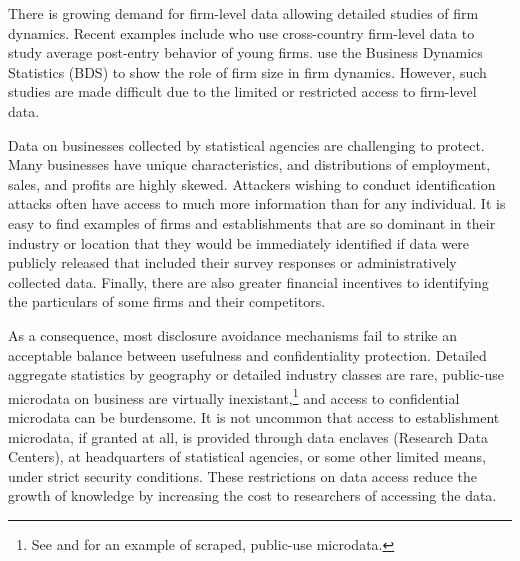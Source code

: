 There is growing demand for firm-level data allowing detailed studies of firm dynamics. Recent examples include \textcite{NBERc0480} who use cross-country firm-level data to study average post-entry behavior of young firms. \textcite{10.1257/aer.20141280} use the Business Dynamics Statistics (BDS) to show the role of firm size in firm dynamics. However, such studies are made difficult due to the limited or restricted access to firm-level data.

Data on businesses collected by statistical agencies are challenging to protect. Many businesses have unique characteristics, and distributions of employment, sales, and profits are highly skewed. Attackers wishing to conduct identification attacks often have access to much more information than for any individual. It is easy to find examples of firms and establishments that are so dominant in their industry or location that they would be immediately identified if  data were publicly released that included their survey responses or administratively collected data. Finally, there are also greater financial incentives to identifying the particulars of some firms and their competitors.

As a consequence, most disclosure avoidance mechanisms  fail to strike an acceptable balance between usefulness and confidentiality protection. Detailed aggregate statistics by geography or detailed industry classes  are rare, public-use microdata on business are virtually inexistant,\footnote{See \citet{NBERw22095} and \citet{startupcartography} for an example of scraped, public-use microdata.} and access to confidential microdata can be burdensome. It is not uncommon that access to establishment microdata, if granted at all, is provided through data enclaves (Research Data Centers), at headquarters of statistical agencies, or some other limited means, under strict security conditions. These restrictions on data access reduce the growth of knowledge by increasing the cost to researchers of accessing the data.

